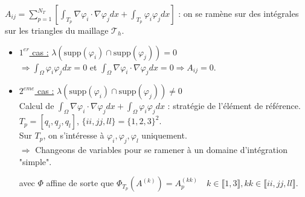 \documentclass[12pt,a4paper]{article}
\begin{document}
$A_{ij} = \sum_{p=1}^{N_T} \left[ \int_{T_p} \nabla \varphi_i \cdot \nabla \varphi_j dx + \int_{T_p} \varphi_i \varphi_j dx \right]$ : on se ramène sur des intégrales sur les triangles du maillage $\mathcal{T}_h$. \\

\begin{itemize}
    \item \underline{$1^{er}$ cas :} $\lambda (\text{supp}(\varphi_i) \cap \text{supp}(\varphi_j)) = 0$ \\
    $\Rightarrow \int_{\Omega} \varphi_i \varphi_j dx = 0$ et $\int_{\Omega} \nabla \varphi_i \cdot \nabla \varphi_j dx = 0 \Rightarrow A_{ij} = 0$.
    \item \underline{$2^{eme}$ cas :} $\lambda (\text{supp}(\varphi_i) \cap \text{supp}(\varphi_j)) \neq 0$ \\
    Calcul de $\int_{\Omega} \nabla \varphi_i \cdot \nabla \varphi_j dx + \int_{\Omega} \varphi_i \varphi_j dx$ : stratégie de l'élément de référence. \\

    $T_p = \left[ q_i, q_j, q_l \right]$, $\{ii, jj, ll\} = \{1, 2, 3\}^2$. \\
    Sur $T_p$, on s'intéresse à $\varphi_i, \varphi_j, \varphi_l$ uniquement. \\
    $\Rightarrow$ Changeons de variables pour se ramener à un domaine d'intégration "simple". \\


    avec $\Phi$ affine de sorte que $\Phi_{T_p}(A^{(k)}) = A_p^{(kk)} \quad k \in \llbracket 1, 3 \rrbracket, kk \in \llbracket ii, jj, ll \rrbracket$. \\ 
\end{itemize}
\end{document}
